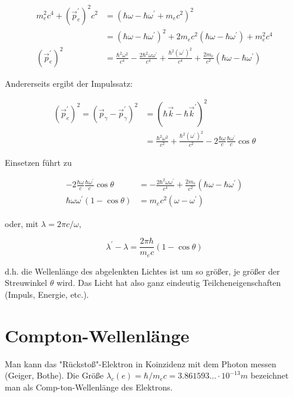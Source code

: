 \documentclass[10pt, letterpaper]{article}
\begin{document}
$$
\begin{aligned}
m_{e}^{2} c^{4}+\left(\vec{p}_{e}^{\prime}\right)^{2} c^{2} & =\left(\hbar \omega-\hbar \omega^{\prime}+m_{e} c^{2}\right)^{2} \\
& =\left(\hbar \omega-\hbar \omega^{\prime}\right)^{2}+2 m_{e} c^{2}\left(\hbar \omega-\hbar \omega^{\prime}\right)+m_{e}^{2} c^{4} \\
\left(\vec{p}_{e}^{\prime}\right)^{2} & =\frac{\hbar^{2} \omega^{2}}{c^{4}}-\frac{2 \hbar^{2} \omega \omega^{\prime}}{c^{4}}+\frac{\hbar^{2}\left(\omega^{\prime}\right)^{2}}{c^{4}}+\frac{2 m_{e}}{c^{2}}\left(\hbar \omega-\hbar \omega^{\prime}\right)
\end{aligned}
$$

Andererseits ergibt der Impulssatz:

$$
\begin{aligned}
\left(\vec{p}_{e}^{\prime}\right)^{2}=\left(\vec{p}_{\gamma}-\vec{p}_{\gamma}^{\prime}\right)^{2} & =\left(\hbar \vec{k}-\hbar \vec{k}^{\prime}\right)^{2} \\
& =\frac{\hbar^{2} \omega^{2}}{c^{2}}+\frac{\hbar^{2}\left(\omega^{\prime}\right)^{2}}{c^{2}}-2 \frac{\hbar \omega}{c} \frac{\hbar \omega^{\prime}}{c} \cos \theta
\end{aligned}
$$

Einsetzen führt zu

$$
\begin{aligned}
-2 \frac{\hbar \omega}{c} \frac{\hbar \omega^{\prime}}{c} \cos \theta & =-\frac{2 \hbar^{2} \omega \omega^{\prime}}{c^{4}}+\frac{2 m_{e}}{c^{2}}\left(\hbar \omega-\hbar \omega^{\prime}\right) \\
\hbar \omega \omega^{\prime}(1-\cos \theta) & =m_{e} c^{2}\left(\omega-\omega^{\prime}\right)
\end{aligned}
$$

oder, mit $\lambda=2 \pi c / \omega$,

$$
\lambda^{\prime}-\lambda=\frac{2 \pi \hbar}{m_{e} c}(1-\cos \theta)
$$

d.h. die Wellenlänge des abgelenkten Lichtes ist um so größer, je größer der Streuwinkel $\theta$ wird. Das Licht hat also ganz eindeutig Teilcheneigenschaften (Impuls, Energie, etc.).

\section*{Compton-Wellenlänge}
Man kann das "Rückstoß"-Elektron in Koinzidenz mit dem Photon messen (Geiger, Bothe). Die Größe $\lambda_{c}(e)=\hbar / m_{e} c=3.861593 \ldots \cdot 10^{-13} m$ bezeichnet man als Comp-ton-Wellenlänge des Elektrons.
\end{document}
